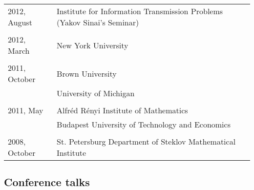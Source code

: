 \documentclass[letterpaper,11pt]{article}
\begin{document}
\begin{longtable}{llc}
	2012, August
	& Institute for Information Transmission Problems
	(Yakov Sinai's Seminar)
	\\\\

	2012, March & New York University\\\\

	2011, October & Brown University \\
	&University of Michigan
	\\
	\\
	2011, May& Alfr\'ed R\'enyi Institute of Mathematics
	\\
	& Budapest University of Technology and Economics
	\\\\

	2008, October &
	St. Petersburg Department of Steklov Mathematical
	Institute%
	\\
\end{longtable}
\bigskip



\subsection*{Conference talks}
\end{document}
